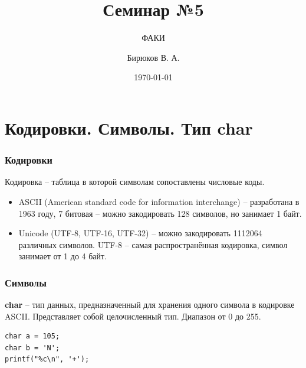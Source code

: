 \documentclass[12pt,pdf,hyperref={unicode}]{beamer}
\title{Семинар №5}
\subtitle{ФАКИ \the\year}
\author{Бирюков В. А.}
\date{\today}
\begin{document}
\lstset{language=C}

\begin{frame}
\titlepage
\end{frame} 



\section{Кодировки. Символы. Тип char}

\begin{frame}[fragile]
\frametitle{Кодировки} 
Кодировка -- таблица в которой символам сопоставлены числовые коды.
\begin{itemize}
\item ASCII (American standard code for information interchange) -- разработана в 1963 году, 7 битовая -- можно закодировать 128 символов, но занимает 1 байт.
\item Unicode (UTF-8, UTF-16, UTF-32) -- можно закодировать 1112064 различных символов. UTF-8 -- самая распространённая кодировка, символ занимает от 1 до 4 байт.
\end{itemize}
\end{frame}


\begin{frame}[fragile]
\frametitle{Символы} 
\textbf{char} -- тип данных, предназначенный для хранения одного символа в кодировке ASCII. Представляет собой целочисленный тип. Диапазон от 0 до 255.
\begin{lstlisting}
char a = 105;
char b = 'N';
printf("%c\n", '+');
\end{lstlisting}
\end{frame}
\end{document}
